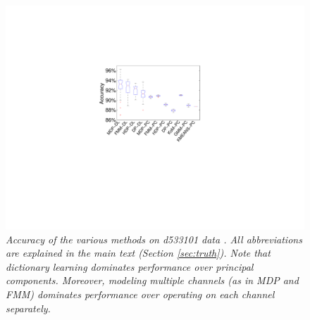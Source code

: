 \documentclass[journal]{IEEEtran}
\begin{document}
\begin{figure}[h!]
  \centering
    \includegraphics[width=1.0\linewidth]{figs_new/Accuracy_hc_1.pdf}
    \caption{\textit{\small{ Accuracy of the various methods on d533101 data \cite{Henze2000}. All abbreviations are explained in the main text (Section \ref{sec:truth}).  Note that dictionary learning dominates performance over principal components.  Moreover, modeling multiple channels (as in MDP and FMM) dominates performance over operating on each channel separately.   
}}}
\label{fig:Accuracy_hc_1}
\end{figure}
\end{document}
